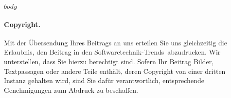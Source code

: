 \documentclass[
    $if(classoption)$
    $for(classoption)$$classoption$$sep$,$endfor$
    $endif$
]{$documentclass$}
\newcommand{\stt}{Soft\-ware\-tech\-nik-Trends}
\begin{document}


    $body$

\paragraph{Copyright.}

Mit der Übersendung Ihres Beitrags an uns erteilen Sie uns gleichzeitig die Erlaubnis,
den Beitrag in den \stt\ abzudrucken. Wir unterstellen, dass Sie hierzu berechtigt sind.
Sofern Ihr Beitrag Bilder, Textpassagen oder andere Teile enthält, deren Copyright
von einer dritten Instanz gehalten wird, sind Sie dafür verantwortlich,
entsprechende Genehmigungen zum Abdruck zu beschaffen.


\printbibliography
\end{document}
